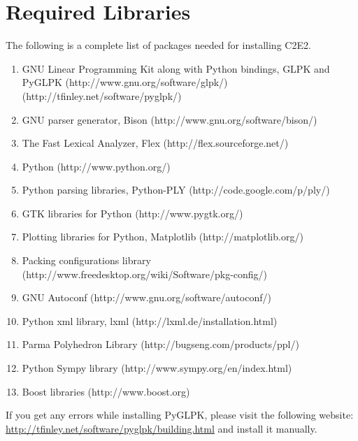 \documentclass{tufte-book} %
\begin{document}
\chapter{Required Libraries}
\label{app:packs}
The following is a complete list of packages needed for installing C2E2. 
\begin{enumerate}
 \item GNU Linear Programming Kit along with Python bindings, GLPK and PyGLPK (http://www.gnu.org/software/glpk/) (http://tfinley.net/software/pyglpk/)
 \item GNU parser generator, Bison (http://www.gnu.org/software/bison/)
 \item The Fast Lexical Analyzer, Flex (http://flex.sourceforge.net/) 
 \item Python (http://www.python.org/)
 \item Python parsing libraries, Python-PLY (http://code.google.com/p/ply/)
 \item GTK libraries for Python (http://www.pygtk.org/)
 \item Plotting libraries for Python, Matplotlib (http://matplotlib.org/)
 \item Packing configurations library  (http://www.freedesktop.org/wiki/Software/pkg-config/)
 \item GNU Autoconf (http://www.gnu.org/software/autoconf/)
 \item Python xml library, lxml (http://lxml.de/installation.html)
 \item Parma Polyhedron Library (http://bugseng.com/products/ppl/)
 \item Python Sympy library (http://www.sympy.org/en/index.html)
 \item Boost libraries (http://www.boost.org)
\end{enumerate}

If you get any errors while installing PyGLPK, please visit the following website:\\ \url{http://tfinley.net/software/pyglpk/building.html} and install it manually.

\backmatter




\printindex %
\end{document}
